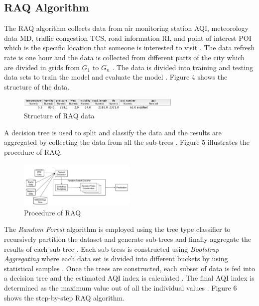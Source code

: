 \documentclass[sigconf]{acmart}
\begin{document}
\subsection{RAQ Algorithm}
The RAQ algorithm collects data from air monitoring station AQI, meteorology data MD, traffic congestion TCS, road information RI, and point of interest POI which is the specific location that someone is interested to visit \cite{raq2016}. The data refresh rate is one hour and the data is collected from different parts of the city which are divided in grids from $G_1$ to $G_n$ \cite{raq2016}. The data is divided into training and testing data sets to train the model and evaluate the model \cite{raq2016}. Figure 4 shows the structure of the data.

\begin{figure}
\includegraphics[width=0.7\textwidth]{images/fig4.png}
\caption{Structure of RAQ data\cite{raq2016}}
\end{figure}

A decision tree is used to split and classify the data and the results are aggregated by collecting the data from all the sub-trees \cite{raq2016}. Figure 5 illustrates the procedure of RAQ.

\begin{figure}
\includegraphics[width=0.5\textwidth]{images/fig5.png}
\caption{Procedure of RAQ \cite{raq2016}}
\end{figure}

The {\em Random Forest} algorithm is employed using the tree type classifier to recursively partition the dataset and generate sub-trees and finally aggregate the results of each sub-tree \cite{raq2016}. Each sub-tress is constructed using {\em Bootstrap Aggregating} where each data set is divided into different buckets by using statistical samples \cite{raq2016}. Once the trees are constructed, each subset of data is fed into a decision tree and the estimated AQI index is calculated \cite{raq2016}. The final AQI index is determined as the maximum value out of all the individual values \cite{raq2016}. Figure 6 shows the step-by-step RAQ algorithm.
\end{document}
